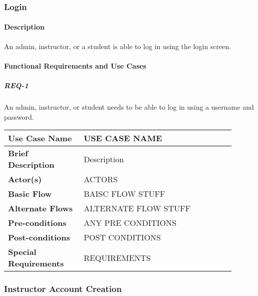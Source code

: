 \documentclass{article}
\begin{document}


\subsubsection{Login}




\paragraph{Description} An admin, instructor, or a student is able to log in using the login screen.

\paragraph{Functional Requirements and Use Cases}

\subparagraph{REQ-1} An admin, instructor, or student needs to be able to log in using a username and password.



\begin{tabular}{| p{0.3\linewidth} | p{0.6\linewidth} |}
  \hline
  \textbf{Use Case Name} & USE CASE NAME \\
  \hline
  \textbf{Brief Description} & Description \\
  \hline
  \textbf{Actor(s)} & ACTORS \\
  \hline
  \textbf{Basic Flow} & BAISC FLOW STUFF \\
  \hline
  \textbf{Alternate Flows} & ALTERNATE FLOW STUFF \\
  \hline
  \textbf{Pre-conditions} & ANY PRE CONDITIONS \\
  \hline
  \textbf{Post-conditions} & POST CONDITIONS\\
  \hline
  \textbf{Special Requirements} & REQUIREMENTS \\
  \hline
\end{tabular}





\subsubsection{Instructor Account Creation}
\end{document}
